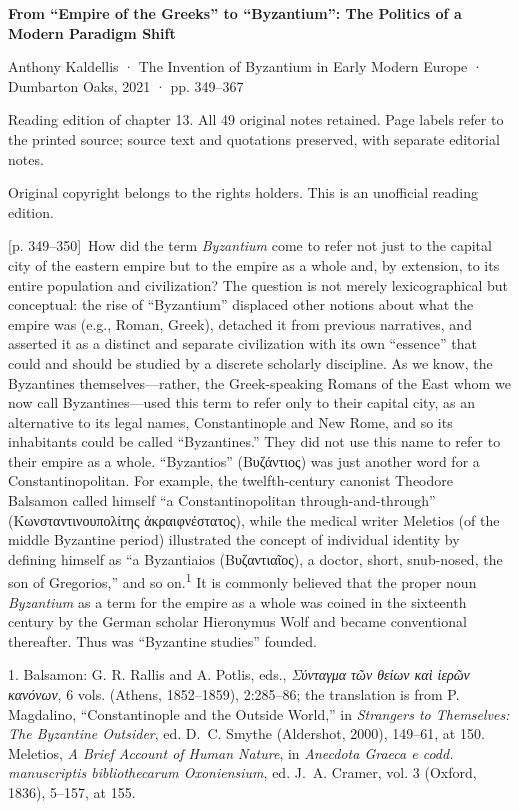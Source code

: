 \documentclass[10pt,a4paper]{article}
\begin{document}
{\Large\bfseries From “Empire of the Greeks” to “Byzantium”: The Politics of a Modern Paradigm Shift\par}\medskip
Anthony Kaldellis · The Invention of Byzantium in Early Modern Europe · Dumbarton Oaks, 2021 · pp. 349–367\par
Reading edition of chapter 13. All 49 original notes retained. Page labels refer to the printed source; source text and quotations preserved, with separate editorial notes.\par
Original copyright belongs to the rights holders. This is an unofficial reading edition.\par\bigskip
{\scriptsize\color{gray}[p. 349–350]}\ How did the term \textit{Byzantium} come to refer not just to the capital city of the eastern empire but to the empire as a whole and, by extension, to its entire population and civilization? The question is not merely lexicographical but conceptual: the rise of “Byzantium” displaced other notions about what the empire was (e.g., Roman, Greek), detached it from previous narratives, and asserted it as a distinct and separate civilization with its own “essence” that could and should be studied by a discrete scholarly discipline. As we know, the Byzantines themselves—rather, the Greek-speaking Romans of the East whom we now call Byzantines—used this term to refer only to their capital city, as an alternative to its legal names, Constantinople and New Rome, and so its inhabitants could be called “Byzantines.” They did not use this name to refer to their empire as a whole. “Byzantios” (Βυζάντιος) was just another word for a Constantinopolitan. For example, the twelfth-century canonist Theodore Balsamon called himself “a Constantinopolitan through-and-through” (Κωνσταντινουπολίτης ἀκραιφνέστατος), while the medical writer Meletios (of the middle Byzantine period) illustrated the concept of individual identity by defining himself as “a Byzantiaios (Βυζαντιαῖος), a doctor, short, snub-nosed, the son of Gregorios,” and so on.\nobreak\textsuperscript{1} It is commonly believed that the proper noun \textit{Byzantium} as a term for the empire as a whole was coined in the sixteenth century by the German scholar Hieronymus Wolf and became conventional thereafter. Thus was “Byzantine studies” founded.\par{\small 1.  Balsamon: G. R. Rallis and A. Potlis, eds., \textit{Σύνταγμα τῶν θείων καὶ ἱερῶν κανόνων}, 6 vols. (Athens, 1852–1859), 2:285–86; the translation is from P. Magdalino, “Constantinople and the Outside World,” in \textit{Strangers to Themselves: The Byzantine Outsider}, ed.\textit{ }D. C. Smythe (Aldershot, 2000), 149–61, at 150. Meletios, \textit{A Brief Account of Human Nature}, in \textit{Anecdota Graeca e codd. manuscriptis bibliothecarum Oxoniensium}, ed. J. A. Cramer, vol. 3 (Oxford, 1836), 5–157, at 155.\par}
\end{document}
